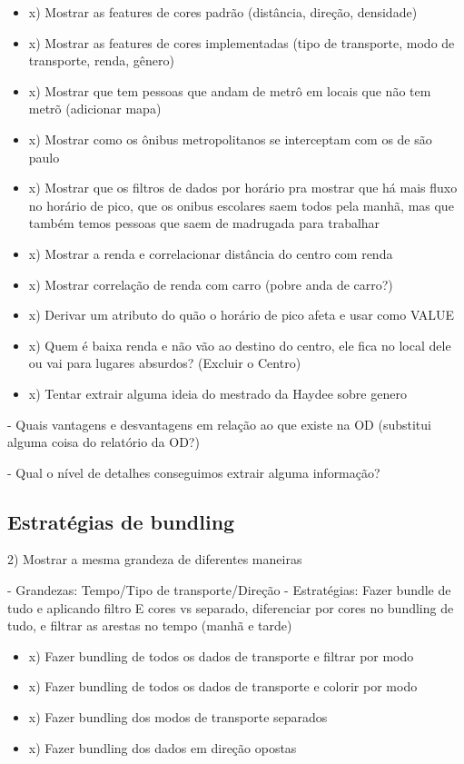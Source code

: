   \begin{itemize}
    \item x) Mostrar as features de cores padrão (distância, direção, densidade)
    \item x) Mostrar as features de cores implementadas (tipo de transporte, modo de transporte, renda, gênero)
    \item x) Mostrar que tem pessoas que andam de metrô em locais que não tem metrõ (adicionar mapa)
    \item x) Mostrar como os ônibus metropolitanos se interceptam com os de são paulo
    \item x) Mostrar que os filtros de dados por horário pra mostrar que há mais fluxo
       no horário de pico, que os onibus escolares saem todos pela manhã, mas que também temos
      pessoas que saem de madrugada para trabalhar
    \item x) Mostrar a renda e correlacionar distância do centro com renda
    \item x) Mostrar correlação de renda com carro (pobre anda de carro?)
    \item x) Derivar um atributo do quão o horário de pico afeta e usar como VALUE

    \item x) Quem é baixa renda e não vão ao destino do centro, ele fica no local dele ou vai para lugares absurdos? (Excluir o Centro)
    \item x) Tentar extrair alguma ideia do mestrado da Haydee sobre genero
  \end{itemize}

	- Quais vantagens e desvantagens em relação ao que existe na OD (substitui alguma coisa do relatório da OD?)

	- Qual o nível de detalhes conseguimos extrair alguma informação?

  
\subsection{Estratégias de bundling}

2) Mostrar a mesma grandeza de diferentes maneiras

- Grandezas: Tempo/Tipo de transporte/Direção
- Estratégias: Fazer bundle de tudo e aplicando filtro E cores vs separado,
diferenciar por cores no bundling de tudo, e filtrar as arestas no tempo (manhã
e tarde)

  \begin{itemize}
    \item x) Fazer bundling de todos os dados de transporte e filtrar por modo
    \item x) Fazer bundling de todos os dados de transporte e colorir por modo
    \item x) Fazer bundling dos modos de transporte separados
    \item x) Fazer bundling dos dados em direção opostas
  \end{itemize}

